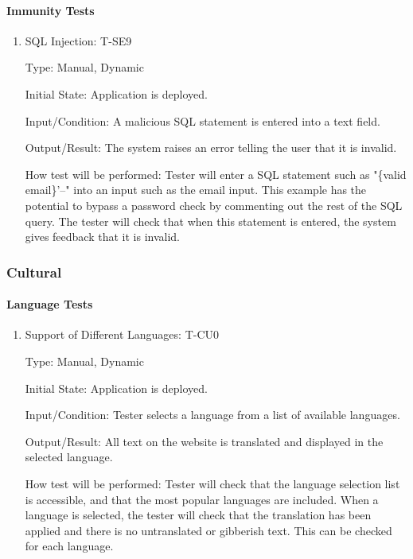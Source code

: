 \documentclass[12pt, titlepage]{article}
\begin{document}
\paragraph{Immunity Tests}

\begin{enumerate}

\item{SQL Injection: T-SE9\\}

Type: Manual, Dynamic
					
Initial State: Application is deployed.
					
Input/Condition: A malicious SQL statement is entered into a text field.
					
Output/Result: The system raises an error telling the user that it is invalid.
					
How test will be performed: Tester will enter a SQL statement such as "\{valid email\}'--" into an input such as the email input. This example has the potential to bypass a password check by commenting out the rest of the SQL query. The tester will check that when this statement is entered, the system gives feedback that it is invalid.

\end{enumerate}

\subsubsection{Cultural}
		
\paragraph{Language Tests}

\begin{enumerate}

\item{Support of Different Languages: T-CU0\\}

Type: Manual, Dynamic
					
Initial State: Application is deployed.
					
Input/Condition: Tester selects a language from a list of available languages.
					
Output/Result: All text on the website is translated and displayed in the selected language.
					
How test will be performed: Tester will check that the language selection list is accessible, and that the most popular languages are included. When a language is selected, the tester will check that the translation has been applied and there is no untranslated or gibberish text. This can be checked for each language.
\end{enumerate}
\end{document}

